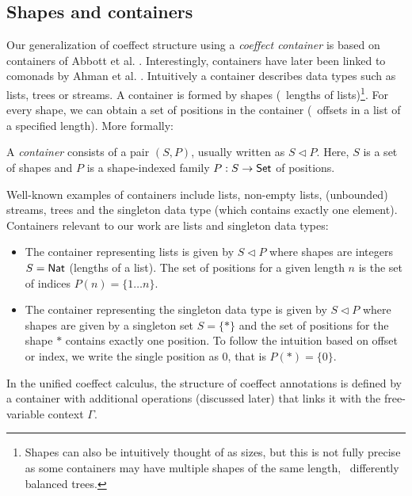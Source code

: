 \subsection{Shapes and containers}
Our generalization of coeffect structure using a \emph{coeffect container} is based on containers of 
Abbott et al. \cite{types-containers}. Interestingly, containers have later been linked
to comonads by Ahman et al. \cite{comonads-containers}. Intuitively a container describes data
types such as lists, trees or streams. A container is formed by shapes (\eg~lengths of 
lists)\footnote{Shapes can also be intuitively thought of as sizes, but this is not fully precise 
as some containers may have multiple shapes of the same length, \eg~differently balanced trees.}.
For every shape, we can obtain a set of positions in the container (\eg~offsets in a list of a
specified length). More formally:

\begin{definition}
A \emph{container} consists of a pair $(S,P)$, usually written as $S \triangleleft P$. 
Here, $S$ is a set of shapes and $P$ is a shape-indexed family $P : S \rightarrow \textnormal{\sffamily Set}$ 
of positions.
\end{definition}

\noindent
Well-known examples of containers include lists, non-empty lists, (un\-boun\-ded) streams,
trees and the singleton data type (which contains exactly one element). Containers relevant 
to our work are lists and singleton data types:

\begin{itemize}
\item The container representing lists is given by $S \triangleleft P$ where 
  shapes are integers $S = \ident{Nat}$ (lengths of a list). The set of positions for a 
  given length $n$ is the set of indices $P(n)= \{ 1 \ldots n \}$.

\item The container representing the singleton data type is given by $S \triangleleft P$ where
  shapes are given by a singleton set $S = \{ \ast \}$ and the set of positions for the
  shape $\ast$ contains exactly one position. To follow the intuition based on offset or 
  index, we write the single position as $0$, that is $P(\ast) = \{ 0 \}$.
\end{itemize}

\noindent
In the unified coeffect calculus, the structure of coeffect annotations is defined by a 
container with additional operations (discussed later) that links it with the free-variable 
context $\Gamma$. 

